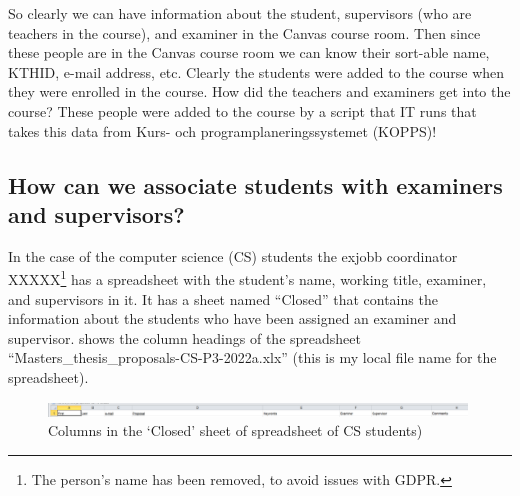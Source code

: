 So clearly we can have information about the student, supervisors (who are teachers in the course), and examiner in the Canvas course room. Then since these people are in the Canvas course room we can know their sort-able name, KTHID, e-mail address, etc. Clearly the students were added to the course when they were enrolled in the course. How did the teachers and examiners get into the course? These people were added to the course by a script that IT runs that takes this data from Kurs- och programplaneringssystemet (KOPPS)!

\subsection{How can we associate students with examiners and supervisors?}
In the case of the computer science (CS) students the exjobb coordinator XXXXX\footnote{The person's name has been removed, to avoid issues with GDPR.} has a spreadsheet with the student’s name, working title, examiner, and supervisors in it. It has a sheet named “Closed” that contains the information about the students who have been assigned an examiner and supervisor.  shows the column headings of the spreadsheet “Masters\_thesis\_proposals-CS-P3-2022a.xlx” (this is my local file name for the spreadsheet).
	
\begin{figure}[!ht]
  \begin{center}
    \includegraphics[width=0.99\textwidth]{README_notes/README-examiner-figures/sheet-columns-Screenshot_20220325_155622.png}
  \end{center}
  \caption{Columns in the `Closed' sheet of spreadsheet of CS students)}
  \label{fig:spreadsheetOfCSStudents}
\end{figure}

